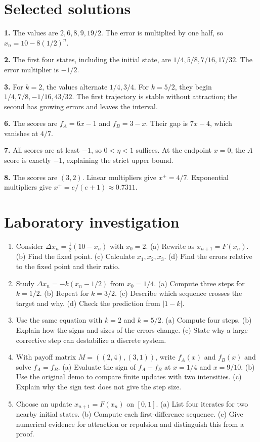 \documentclass[11pt,oneside,openany]{book}
\theoremstyle{definition}
\theoremstyle{remark}
\numberwithin{equation}{chapter}
\providecommand{\tightlist}{\setlength{\itemsep}{0pt}\setlength{\parskip}{0pt}}
\newcommand{\labheading}{\FloatBarrier\section*{Laboratory investigation}\addcontentsline{toc}{section}{Laboratory investigation}}
\begin{document}
\section{Selected solutions}\label{ch02-selected-solutions}

\textbf{1.} The values are \(2,6,8,9,19/2\). The error is multiplied by one half, so \(x_n=10-8(1/2)^n\).

\textbf{2.} The first four states, including the initial state, are \(1/4,5/8,7/16,17/32\). The error multiplier is \(-1/2\).

\textbf{3.} For \(k=2\), the values alternate \(1/4,3/4\). For \(k=5/2\), they begin \(1/4,7/8,-1/16,43/32\). The first trajectory is stable without attraction; the second has growing errors and leaves the interval.

\textbf{6.} The scores are \(f_A=6x-1\) and \(f_B=3-x\). Their gap is \(7x-4\), which vanishes at \(4/7\).

\textbf{7.} All scores are at least \(-1\), so \(0<\eta<1\) suffices. At the endpoint \(x=0\), the \(A\) score is exactly \(-1\), explaining the strict upper bound.

\textbf{8.} The scores are \((3,2)\). Linear multipliers give \(x^+=4/7\). Exponential multipliers give \(x^+=e/(e+1)\approx0.7311\).
\labheading\begin{enumerate}
\def\labelenumi{\arabic{enumi}.}
\tightlist
\item
  Consider \(\Delta x_n=\tfrac12(10-x_n)\) with \(x_0=2\). (a) Rewrite as \(x_{n+1}=F(x_n)\). (b) Find the fixed point. (c) Calculate \(x_1,x_2,x_3\). (d) Find the errors relative to the fixed point and their ratio.
\item
  Study \(\Delta x_n=-k(x_n-1/2)\) from \(x_0=1/4\). (a) Compute three steps for \(k=1/2\). (b) Repeat for \(k=3/2\). (c) Describe which sequence crosses the target and why. (d) Check the prediction from \(|1-k|\).
\item
  Use the same equation with \(k=2\) and \(k=5/2\). (a) Compute four steps. (b) Explain how the signs and sizes of the errors change. (c) State why a large corrective step can destabilize a discrete system.
\item
  With payoff matrix \(M=((2,4),(3,1))\), write \(f_A(x)\) and \(f_B(x)\) and solve \(f_A=f_B\). (a) Evaluate the sign of \(f_A-f_B\) at \(x=1/4\) and \(x=9/10\). (b) Use the original demo to compare finite updates with two intensities. (c) Explain why the sign test does not give the step size.
\item
  Choose an update \(x_{n+1}=F(x_n)\) on \([0,1]\). (a) List four iterates for two nearby initial states. (b) Compute each first-difference sequence. (c) Give numerical evidence for attraction or repulsion and distinguish this from a proof.
\end{enumerate}

\FloatBarrier
\end{document}
